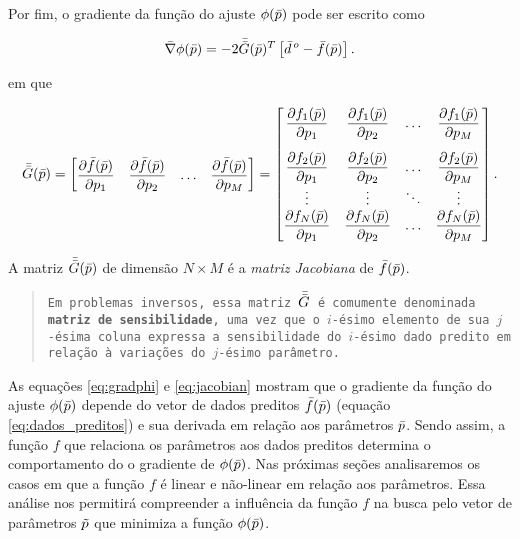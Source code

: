 \noindent Por fim, o gradiente da função do ajuste $\phi(\bar{p})$ pode ser
escrito como

\begin{equation}
\bar{\nabla} \phi(\bar{p}) = -2\bar{\bar{G}}(\bar{p})^T
    \left[\bar{d}^{\thinspace o} - \bar{f}(\bar{p})\right].
\label{eq:gradphi}
\end{equation}

\noindent em que 

\begin{equation}
\mat{G}(\vect{p}) = 
\begin{bmatrix}
    \dfrac{\partial\vect{f}(\vect{p})}{\partial p_1} &
    \dfrac{\partial\vect{f}(\vect{p})}{\partial p_2} &
    \ldots &
    \dfrac{\partial\vect{f}(\vect{p})}{\partial p_M}
\end{bmatrix}
=
\begin{bmatrix}
    \dfrac{\partial f_1(\vect{p})}{\partial p_1} &
        \dfrac{\partial f_1(\vect{p})}{\partial p_2} &
        \ldots &
        \dfrac{\partial f_1(\vect{p})}{\partial p_M}
    \vspace{0.3cm}\\
    \dfrac{\partial f_2(\vect{p})}{\partial p_1} &
        \dfrac{\partial f_2(\vect{p})}{\partial p_2} &
        \ldots & 
        \dfrac{\partial f_2(\vect{p})}{\partial p_M}
    \\
    \vdots & \vdots & \ddots & \vdots
    \\
    \dfrac{\partial f_N(\vect{p})}{\partial p_1} &
        \dfrac{\partial f_N(\vect{p})}{\partial p_2} &
        \ldots & 
        \dfrac{\partial f_N(\vect{p})}{\partial p_M}        
\end{bmatrix}.
\label{eq:jacobian}
\end{equation}

\noindent A matriz $\bar{\bar{G}}(\bar{p})$ de dimensão $N \times M$ é a
{\it matriz Jacobiana} de $\bar{f}(\bar{p})$.

\begin{quote}
{\tt Em problemas inversos, essa matriz $\bar{\bar{G}}$ é comumente denominada
{\bf matriz de sensibilidade}, uma vez que o $i$-ésimo elemento de sua $j$-ésima
coluna expressa a sensibilidade do $i$-ésimo dado pre\-di\-to em re\-la\-ção à variações
do $j$-ésimo parâmetro.}
\end{quote}

\indent As equações \ref{eq:gradphi} e \ref{eq:jacobian} mostram que o gradiente
da função do ajuste $\phi(\bar{p})$ depende do vetor de dados preditos
$\bar{f}(\bar{p})$ (equação \ref{eq:dados_preditos}) e sua derivada em relação
aos parâmetros $\bar{p}$.
Sendo assim, a função $f$ que relaciona os parâmetros aos dados preditos determina
o comportamento do o gradiente de $\phi(\bar{p})$.
Nas próximas seções analisaremos os casos em que a função $f$ é linear e
não-linear em relação aos parâmetros.
Essa análise nos permitirá compreender a influência da função $f$ na busca pelo
vetor de parâmetros $\tilde{p}$ que minimiza a função $\phi(\bar{p})$.



